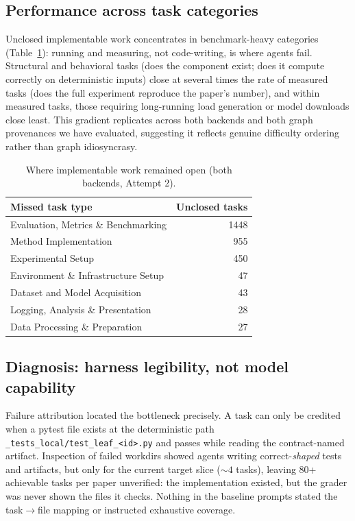 \documentclass{article}
\begin{document}
\subsection{Performance across task categories}

Unclosed implementable work concentrates in benchmark-heavy categories
(Table~\ref{tab:categories}): running and measuring, not code-writing, is
where agents fail. Structural and behavioral tasks (does the component exist;
does it compute correctly on deterministic inputs) close at several times the
rate of measured tasks (does the full experiment reproduce the paper's
number), and within measured tasks, those requiring long-running load
generation or model downloads close least. This gradient replicates across
both backends and both graph provenances we have evaluated, suggesting it
reflects genuine difficulty ordering rather than graph idiosyncrasy.

\begin{table}[t]
\caption{Where implementable work remained open (both backends, Attempt 2).}
\label{tab:categories}
\begin{center}
\small
\begin{tabular}{lr}
\toprule
\textbf{Missed task type} & \textbf{Unclosed tasks} \\
\midrule
Evaluation, Metrics \& Benchmarking & 1448 \\
Method Implementation & 955 \\
Experimental Setup & 450 \\
Environment \& Infrastructure Setup & 47 \\
Dataset and Model Acquisition & 43 \\
Logging, Analysis \& Presentation & 28 \\
Data Processing \& Preparation & 27 \\
\bottomrule
\end{tabular}
\end{center}
\end{table}

\subsection{Diagnosis: harness legibility, not model capability}

Failure attribution located the bottleneck precisely. A task can only be
credited when a pytest file exists at the deterministic path
\texttt{\_tests\_local/test\_leaf\_<id>.py} and passes while reading the
contract-named artifact. Inspection of failed workdirs showed agents writing
correct-\emph{shaped} tests and artifacts, but only for the current target
slice (${\sim}4$ tasks), leaving 80+ achievable tasks per paper unverified:
the implementation existed, but the grader was never shown the files it
checks. Nothing in the baseline prompts stated the task$\rightarrow$file
mapping or instructed exhaustive coverage.
\end{document}
